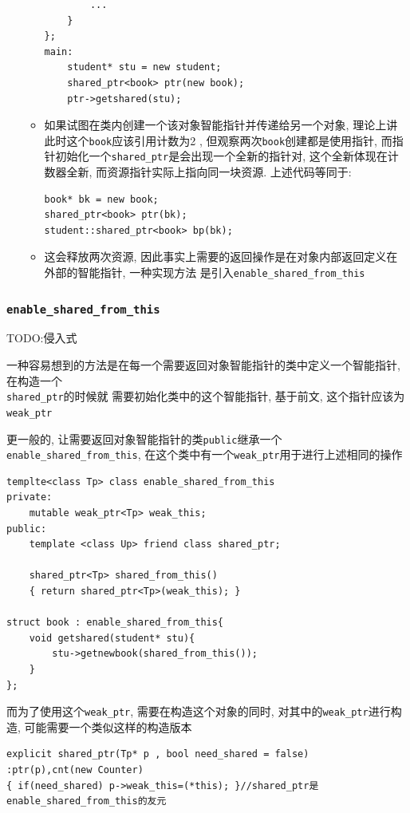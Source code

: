 \begin{enumerate}
\begin{itemize}
\begin{lstlisting}
		...
	}
};
main:
	student* stu = new student;
	shared_ptr<book> ptr(new book);
	ptr->getshared(stu);
		\end{lstlisting}
		\item 如果试图在类内创建一个该对象智能指针并传递给另一个对象, 理论上讲此时这个{\tt book}应该引用计数为2
				, 但观察两次{\tt book}创建都是使用指针, 而指针初始化一个{\tt shared\_ptr}是会出现一个全新的指针对, 
				这个全新体现在计数器全新, 而资源指针实际上指向同一块资源. 上述代码等同于:
		\begin{lstlisting}
book* bk = new book;
shared_ptr<book> ptr(bk);
student::shared_ptr<book> bp(bk);
		\end{lstlisting}
		
		\item 这会释放两次资源, 因此事实上需要的返回操作是在对象内部返回定义在外部的智能指针, 一种实现方法
				是引入{\tt enable\_shared\_from\_this}
	\end{itemize}

\end{enumerate}
\subsubsection{\tt enable\_shared\_from\_this}
TODO:侵入式

一种容易想到的方法是在每一个需要返回对象智能指针的类中定义一个智能指针, 在构造一个\\{\tt shared\_ptr}的时候就
	需要初始化类中的这个智能指针, 基于前文, 这个指针应该为{\tt weak\_ptr}

更一般的, 让需要返回对象智能指针的类{\tt public}继承一个{\tt enable\_shared\_from\_this}, 
	在这个类中有一个{\tt weak\_ptr}用于进行上述相同的操作
\begin{lstlisting}
templte<class Tp> class enable_shared_from_this
private:	
	mutable weak_ptr<Tp> weak_this;
public:
	template <class Up> friend class shared_ptr;

    shared_ptr<Tp> shared_from_this() 
	{ return shared_ptr<Tp>(weak_this); }

struct book : enable_shared_from_this{
	void getshared(student* stu){
		stu->getnewbook(shared_from_this());
	}
};
\end{lstlisting}

而为了使用这个{\tt weak\_ptr}, 需要在构造这个对象的同时, 对其中的{\tt weak\_ptr}进行构造, 
	可能需要一个类似这样的构造版本
\begin{lstlisting}
explicit shared_ptr(Tp* p , bool need_shared = false) 
:ptr(p),cnt(new Counter) 
{ if(need_shared) p->weak_this=(*this); }//shared_ptr是enable_shared_from_this的友元
\end{lstlisting}

